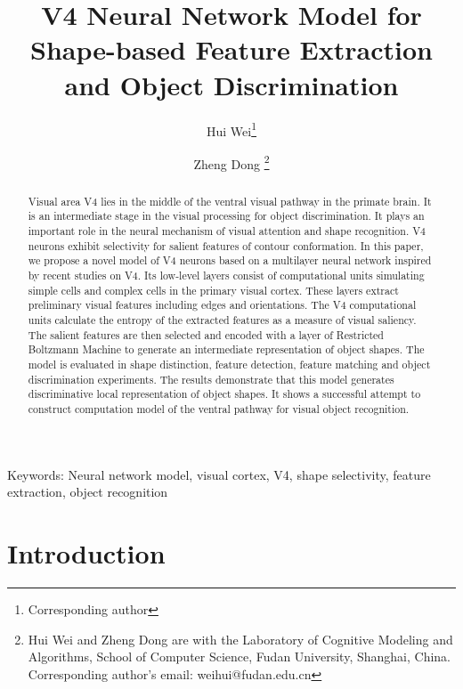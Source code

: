 \documentclass[10pt]{article}
\begin{document}
\title{V4 Neural Network Model for Shape-based Feature Extraction and Object Discrimination}

\author{Hui Wei\footnote{Corresponding author} \and Zheng Dong
\footnote{Hui Wei and Zheng Dong are with the Laboratory of Cognitive Modeling and Algorithms, %
School of Computer Science, Fudan University, Shanghai, China. %
Corresponding author's email: weihui@fudan.edu.cn}}

\date{}

\maketitle

\begin{abstract}
Visual area V4 lies in the middle of the ventral visual pathway in the primate brain. 
It is an intermediate stage in the visual processing for object discrimination. 
It plays an important role in the neural mechanism of visual attention and shape recognition.
V4 neurons exhibit selectivity for salient features of contour conformation.
In this paper, we propose a novel model of V4 neurons based on a multilayer neural network
inspired by recent studies on V4.
Its low-level layers consist of computational units simulating simple cells and complex cells
in the primary visual cortex.
These layers extract preliminary visual features including edges and orientations.
The V4 computational units calculate the entropy of the extracted features 
as a measure of visual saliency.
The salient features are then selected and encoded with a layer of 
Restricted Boltzmann Machine to generate an intermediate representation of object shapes.
The model is evaluated in shape distinction, feature detection, feature matching 
and object discrimination experiments.
The results demonstrate that this model generates discriminative local representation
of object shapes.
It shows a successful attempt to construct computation model of the ventral pathway
for visual object recognition.
\end{abstract}

Keywords:
Neural network model, visual cortex, V4, shape selectivity, feature extraction, object recognition

\section{Introduction}
\end{document}
